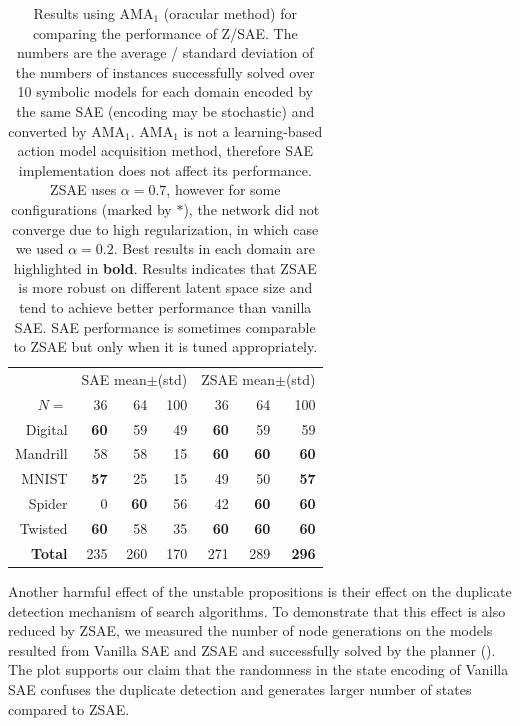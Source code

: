 \begin{table}[htbp]
\centering
\begin{tabular}{r|rrr|rrr}
 & \multicolumn{3}{c|}{SAE mean$\pm$(std)} & \multicolumn{3}{c}{ZSAE mean$\pm$(std)} \\ 
$N=$           & {36}        & {64}        & {100} & {36}        & {64}        & {100}        \\\hline
Digital        & \textbf{60} & 59          & 49    & \textbf{60} & 59          & 59           \\
Mandrill       & 58          & 58          & 15    & \textbf{60} & \textbf{60} & \textbf{60}  \\
MNIST          & \textbf{57} & 25          & 15    & 49          & 50          & \textbf{57}  \\
Spider         & 0           & \textbf{60} & 56    & 42          & \textbf{60} & \textbf{60}  \\
Twisted        & \textbf{60} & 58          & 35    & \textbf{60} & \textbf{60} & \textbf{60}  \\\hline
\textbf{Total} & {235}       & {260}       & {170} & {271}       & {289}       & \textbf{296} \\
\end{tabular}
\caption{Results using AMA$_1$ (oracular method) for comparing the performance of Z/SAE.
The numbers are the average / standard deviation of the numbers of instances successfully solved
 over 10 symbolic models for each domain encoded by the same SAE (encoding may be stochastic) and converted by AMA$_1$.
AMA$_1$ is not a learning-based action model acquisition method, therefore SAE implementation does not affect its performance.
ZSAE uses $\alpha=0.7$, however for some configurations (marked by $*$), the network did not converge due to high regularization, in which case we used $\alpha=0.2$.
Best results in each domain are highlighted in \textbf{bold}.
Results indicates that ZSAE is more robust on different latent space size and tend to achieve better performance than vanilla SAE.
SAE performance is sometimes comparable to ZSAE but only when it is tuned appropriately.
}
\label{tab:ama1}
\end{table}

Another harmful effect of the unstable propositions is
their effect on the duplicate detection mechanism of search algorithms.
To demonstrate that this effect is also reduced by ZSAE,
we measured the number of node generations
on the models resulted from Vanilla SAE and ZSAE and successfully solved by
the planner ().
The plot supports our claim that
the randomness in the state encoding of Vanilla SAE confuses the duplicate detection and
generates larger number of states compared to ZSAE.

